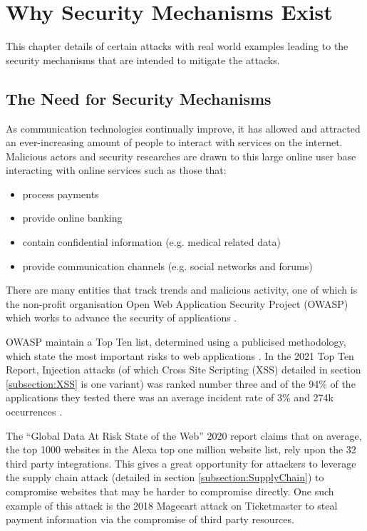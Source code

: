 \documentclass{mscreport}
\begin{document}
\chapter{Why Security Mechanisms Exist}
\label{chap:sec_feat_exist}

This chapter details of certain attacks with real world examples leading to the security mechanisms that are intended to mitigate the attacks.

\section{The Need for Security Mechanisms}
\label{section:need_for_security_mechanisms}

As communication technologies continually improve, it has allowed and attracted an ever-increasing amount of people to interact with services on the internet. Malicious actors and security researches are drawn to this large online user base interacting with online services such as those that:
\begin{itemize}
	\setlength\itemsep{0.1em}
	\item process payments \cite{Herman2019-zb}
	\item provide online banking \cite{Gezer2019-oy}
	\item contain confidential information (e.g. medical related data) \cite{Mrdjenovich2020-vz}
	\item provide communication channels (e.g. social networks and forums)
\end{itemize}

\vspace{0.3cm} \noindent
There are many entities that track trends and malicious activity, one of which is the non-profit organisation Open Web Application Security Project (OWASP) which works to advance the security of applications \cite{noauthor_undated-ta,Kellezi2021-nd}.

\vspace{0.3cm} \noindent
OWASP maintain a Top Ten list, determined using a publicised methodology, which state the most important risks to web applications \cite{Kellezi2021-nd,noauthor_undated-kz}. In the 2021 Top Ten Report, Injection attacks (of which Cross Site Scripting (XSS) detailed in section \ref{subsection:XSS} is one variant) was ranked number three and of the 94\% of the applications they tested there was an average incident rate of 3\% and 274k occurrences \cite{noauthor_undated-gt}.

\vspace{0.3cm} \noindent
The ``Global Data At Risk State of the Web'' 2020 report \cite{Tala_Security2020-ee} claims that on average, the top 1000 websites in the Alexa top one million website list, rely upon the 32 third party integrations. This gives a great opportunity for attackers to leverage the supply chain attack (detailed in section \ref{subsection:SupplyChain}) to compromise websites that may be harder to compromise directly. One such example of this attack is the 2018 Magecart attack on Ticketmaster \cite{Herman2019-zb} to steal payment information via the compromise of third party resources.
\end{document}
